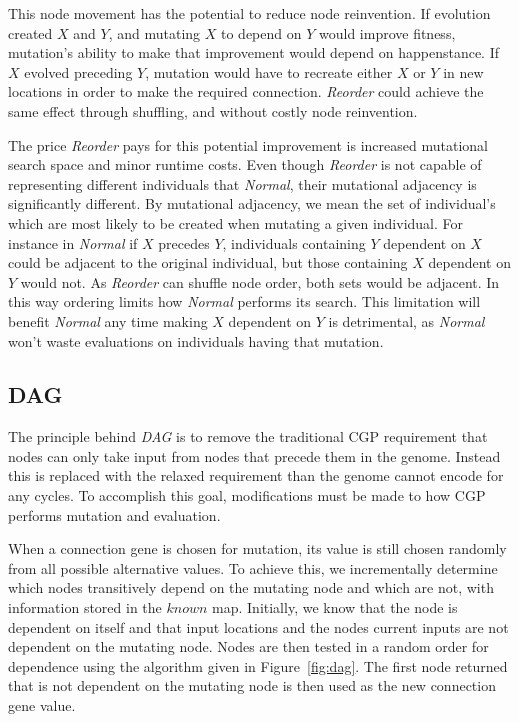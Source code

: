 \documentclass[journal]{IEEEtran}
\begin{document}
This node movement has the potential to reduce node reinvention.  If evolution created
$X$ and $Y$, and mutating $X$ to depend on $Y$ would improve fitness, mutation's
ability to make that improvement would depend on happenstance.  If $X$ evolved
preceding $Y$, mutation would have to recreate either $X$ or $Y$ in new locations
in order to make the required connection.  \emph{Reorder} could achieve the same
effect through shuffling, and without costly node reinvention.

The price \emph{Reorder} pays for this potential improvement is increased mutational search
space and minor runtime costs.  Even though \emph{Reorder} is not capable of representing
different individuals that \emph{Normal}, their mutational adjacency is significantly different.
By mutational adjacency, we mean the set of individual's which are most likely to be created
when mutating a given individual.  For instance in \emph{Normal} if $X$ precedes $Y$, individuals
containing $Y$ dependent on $X$ could be adjacent to the original individual, but those containing
$X$ dependent on $Y$ would not.  As \emph{Reorder} can shuffle node order, both sets would be
adjacent.  In this way ordering limits how \emph{Normal} performs its search.  This limitation
will benefit \emph{Normal} any time making $X$ dependent on $Y$ is detrimental, as
\emph{Normal} won't waste evaluations on individuals having that mutation.


\subsection{DAG}
\label{sec:dag}
The principle behind \emph{DAG} is to remove the traditional CGP requirement that
nodes can only take input from nodes that precede them in the genome.  Instead
this is replaced with the relaxed requirement than the genome cannot encode for
any cycles.  To accomplish this goal, modifications must be made to how CGP
performs mutation and evaluation.

When a connection gene is chosen for mutation, its value is still chosen randomly
from all possible alternative values.  To achieve this, we incrementally determine
which nodes transitively depend on the mutating node and which are not, with
information stored in the $known$ map.  Initially, we know that the node
is dependent on itself and that input locations and the nodes current inputs
are not dependent on the mutating node.  Nodes are then
tested in a random order for dependence using the algorithm given in Figure~\ref{fig:dag}.
The first node returned that is not dependent on the mutating node is then
used as the new connection gene value.
\end{document}
